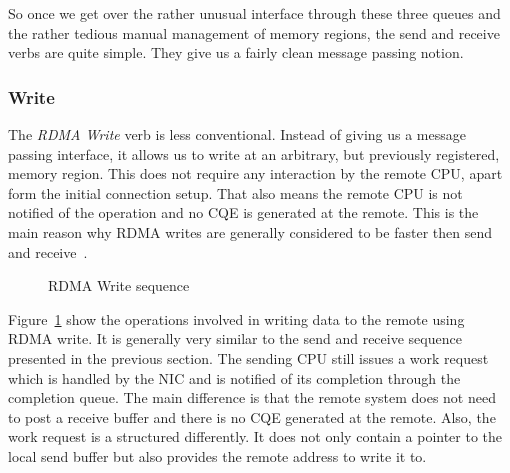 So once we get over the rather unusual interface through these three queues and the rather tedious manual management of 
memory regions, the send and receive verbs are quite simple. They give us a fairly clean message passing notion.


\subsubsection{Write} \label{sec:bg:write}

The \emph{RDMA Write} verb is less conventional. Instead of giving us a message passing interface, it allows us to write at 
an arbitrary, but previously registered, memory region. This does not require any interaction by the remote CPU, apart form
the initial connection setup. 
That also means the remote CPU is not notified of the operation and no CQE is generated at the 
remote. This is the main reason why RDMA writes are generally considered to be faster then send and receive~\cite{anuj-guide}.


\begin{figure}[!ht]
\begin{center}
\end{center}
\caption{RDMA Write sequence}
\label{fig:seq-wrt}
\end{figure}

Figure~\ref{fig:seq-wrt} show the operations involved in writing data to the remote using RDMA write. It is generally very
similar to the send and receive sequence presented in the previous section. The sending CPU still issues a work request which
is handled by the NIC and is notified of its completion through the completion queue.
The main difference is that the remote system does not need to post a receive buffer and there is no CQE generated at the 
remote. Also, the work request is a structured differently. It does not only contain a pointer to the local send buffer but
also provides the remote address to write it to.

